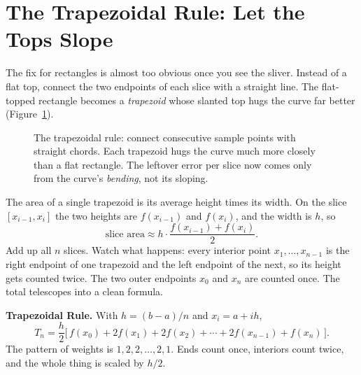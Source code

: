 \section{The Trapezoidal Rule: Let the Tops Slope}
\label{ch27:trap}

The fix for rectangles is almost too obvious once you see the sliver. Instead of a flat top, connect the two endpoints of each slice with a straight line. The flat-topped rectangle becomes a \emph{trapezoid} whose slanted top hugs the curve far better (Figure~\ref{ch27:fig-trap}).

\begin{figure}[H]
\centering
{}
\caption{The trapezoidal rule: connect consecutive sample points with straight chords. Each trapezoid hugs the curve much more closely than a flat rectangle. The leftover error per slice now comes only from the curve's \emph{bending}, not its sloping.}
\label{ch27:fig-trap}
\end{figure}

The area of a single trapezoid is its average height times its width. On the slice $[x_{i-1}, x_i]$ the two heights are $f(x_{i-1})$ and $f(x_i)$, and the width is $h$, so
\[
\text{slice area} \approx h\cdot \frac{f(x_{i-1}) + f(x_i)}{2}.
\]
Add up all $n$ slices. Watch what happens: every interior point $x_1, \dots, x_{n-1}$ is the right endpoint of one trapezoid and the left endpoint of the next, so its height gets counted twice. The two outer endpoints $x_0$ and $x_n$ are counted once. The total telescopes into a clean formula.

\begin{focusbox}
\textbf{Trapezoidal Rule.} With $h = (b-a)/n$ and $x_i = a + i h$,
\[
T_n = \frac{h}{2}\Big[\, f(x_0) + 2f(x_1) + 2f(x_2) + \cdots + 2f(x_{n-1}) + f(x_n) \,\Big].
\]
The pattern of weights is $1,2,2,\dots,2,1$. Ends count once, interiors count twice, and the whole thing is scaled by $h/2$.
\end{focusbox}

